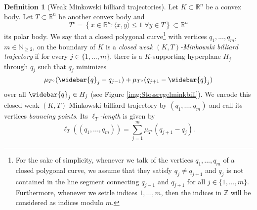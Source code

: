 \documentclass[12pt]{amsart}
\theoremstyle{plain}
\theoremstyle{remark}
\theoremstyle{definition}
\newtheorem{definition}[theorem]{Definition}
\newcommand{\R}{\mathbb{R}}
\newcommand{\N}{\mathbb{N}}
\newcommand{\Z}{\mathbb{Z}}
\def\beq{\begin{equation}}\def\eeq{\end{equation}}
\def\beqq{\begin{equation*}}\def\eeqq{\end{equation*}}
\def\bdefi{\begin{definition}}\def\edefi{\end{definition}}
\begin{document}
\bdefi[Weak Minkowski billiard trajectories]\label{def:weakt} Let $K\subset\R^n$ be a convex body. Let $T\subset\R^n$ be another convex body and
\beqq T^\circ= \left\{x\in\R^n : \langle x,y\rangle \leq 1 \; \forall y\in T \right\}\subset\R^n\eeqq
its polar body. We say that a closed polygonal curve\footnote{For the sake of simplicity, whenever we talk of the vertices $q_1,...,q_m$ of a closed polygonal curve, we assume that they satisfy $q_j\neq q_{j+1}$ and $q_j$ is not contained in the line segment connecting $q_{j-1}$ and $q_{j+1}$ for all $j\in\{1,...,m\}$. Furthermore, whenever we settle indices $1,...,m$, then the indices in $\Z$ will be considered as indices modulo $m$.\label{foot:polygonalline}} with vertices $q_1,...,q_m$, $m\in\N_{\geq 2}$, on the boundary of $K$ is a \textit{closed weak $(K,T)$-Minkowski billiard trajectory} if for every $j\in\{1,...,m\}$, there is a $K$-supporting hyperplane $H_j$ through $q_j$ such that $q_j$ minimizes
\beq \mu_{T^\circ}(\widebar{q}_j-q_{j-1})+\mu_{T^\circ}(q_{j+1}-\widebar{q}_j)\label{eq:Minkowskipolar}\eeq
over all $\widebar{q}_j\in H_j$ (see Figure \ref{img:Stossregelminkbill}). We encode this closed weak $(K,T)$-Minkowski billiard trajectory by $(q_1,...,q_m)$ and call its vertices \textit{bouncing points}. Its \textit{$\ell_T$-length} is given by
\beqq \ell_T((q_1,...,q_m))=\sum_{j=1}^m \mu_{T^\circ}(q_{j+1}-q_j).\eeqq
\edefi
\end{document}
